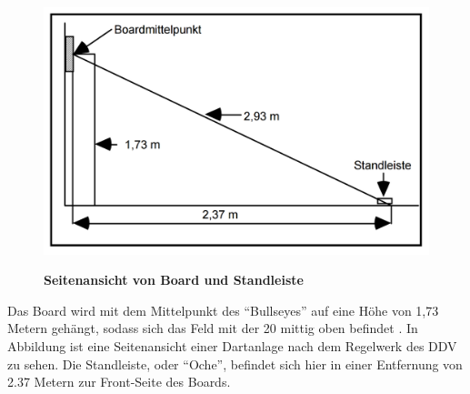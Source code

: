 \begin{figure}
\includegraphics[width=\textwidth]{media/Dartsfield}\\
\caption{\textbf{Seitenansicht von Board und Standleiste 
\cite[8]{DartsRegel2016}}
}
\label{Fig:dartsetup}
\end{figure}


Das Board wird mit dem Mittelpunkt des "`Bullseyes"' auf eine Höhe von 1,73 Metern gehängt, sodass sich das Feld mit der 20 mittig oben befindet \autocite[6-8]{DartsRegel2016}. In Abbildung  ist eine Seitenansicht einer Dartanlage nach dem Regelwerk des DDV zu sehen. Die Standleiste, oder "`Oche"', befindet sich hier in einer Entfernung von 2.37 Metern zur Front-Seite des Boards.

